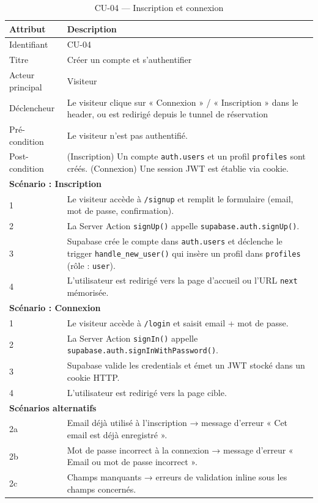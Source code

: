 \documentclass[12pt,a4paper,openany]{report}
\begin{document}
\begin{table}[H]
\centering
\begin{tabularx}{\textwidth}{lX}
\toprule
\textbf{Attribut} & \textbf{Description} \\
\midrule
Identifiant        & CU-04 \\
Titre              & Créer un compte et s'authentifier \\
Acteur principal   & Visiteur \\
Déclencheur        & Le visiteur clique sur « Connexion » / « Inscription » dans le header, ou est redirigé depuis le tunnel de réservation \\
Pré-condition      & Le visiteur n'est pas authentifié. \\
Post-condition     & (Inscription) Un compte \texttt{auth.users} et un profil \texttt{profiles} sont créés. (Connexion) Une session JWT est établie via cookie. \\
\midrule
\multicolumn{2}{l}{\textbf{Scénario : Inscription}} \\
\midrule
1 & Le visiteur accède à \texttt{/signup} et remplit le formulaire (email, mot de passe, confirmation). \\
2 & La Server Action \texttt{signUp()} appelle \texttt{supabase.auth.signUp()}. \\
3 & Supabase crée le compte dans \texttt{auth.users} et déclenche le trigger \texttt{handle\_new\_user()} qui insère un profil dans \texttt{profiles} (rôle : \texttt{user}). \\
4 & L'utilisateur est redirigé vers la page d'accueil ou l'URL \texttt{next} mémorisée. \\
\midrule
\multicolumn{2}{l}{\textbf{Scénario : Connexion}} \\
\midrule
1 & Le visiteur accède à \texttt{/login} et saisit email + mot de passe. \\
2 & La Server Action \texttt{signIn()} appelle \texttt{supabase.auth.signInWithPassword()}. \\
3 & Supabase valide les credentials et émet un JWT stocké dans un cookie HTTP. \\
4 & L'utilisateur est redirigé vers la page cible. \\
\midrule
\multicolumn{2}{l}{\textbf{Scénarios alternatifs}} \\
\midrule
2a & Email déjà utilisé à l'inscription → message d'erreur « Cet email est déjà enregistré ». \\
2b & Mot de passe incorrect à la connexion → message d'erreur « Email ou mot de passe incorrect ». \\
2c & Champs manquants → erreurs de validation inline sous les champs concernés. \\
\bottomrule
\end{tabularx}
\caption{CU-04 — Inscription et connexion}
\end{table}
\end{document}
